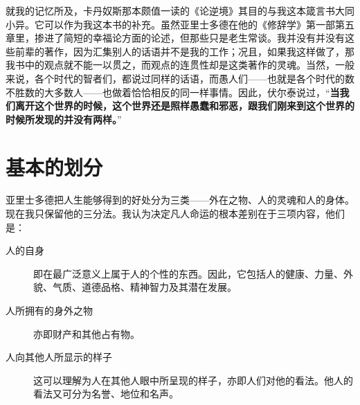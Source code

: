 \documentclass[12pt,oneside]{book}
\begin{document}
就我的记忆所及，卡丹奴斯那本颇值一读的《论逆境》其目的与我这本箴言书大同小异。它可以作为我这本书的补充。虽然亚里士多德在他的《修辞学》第一部第五章里，掺进了简短的幸福论方面的论述，但那些只是老生常谈。我并没有并没有这些前辈的著作，因为汇集别人的话语并不是我的工作；况且，如果我这样做了，那我书中的观点就不能一以贯之，而观点的连贯性却是这类著作的灵魂。当然，一般来说，各个时代的智者们，都说过同样的话语，而愚人们——也就是各个时代的数不胜数的大多数人——也做着恰恰相反的同一样事情。因此，伏尔泰说过，“\textbf{当我们离开这个世界的时候，这个世界还是照样愚蠢和邪恶，跟我们刚来到这个世界的时候所发现的并没有两样。}” 


\setcounter{tocdepth}{2}    
\tableofcontents


\mainmatter
\chapter{基本的划分}
亚里士多德把人生能够得到的好处分为三类——外在之物、人的灵魂和人的身体。现在我只保留他的三分法。我认为决定凡人命运的根本差别在于三项内容，他们是： 

\begin{description}
\item[人的自身] 即在最广泛意义上属于人的个性的东西。因此，它包括人的健康、力量、外貌、气质、道德品格、精神智力及其潜在发展。 
\item[人所拥有的身外之物] 亦即财产和其他占有物。 
\item[人向其他人所显示的样子] 这可以理解为人在其他人眼中所呈现的样子，亦即人们对他的看法。他人的看法又可分为名誉、地位和名声。 
\end{description}
\end{document}
